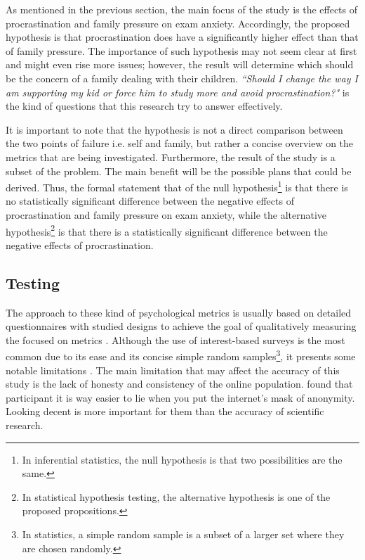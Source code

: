 \documentclass[12pt]{report}
\begin{document}
As mentioned in the previous section, the main focus of the study is the effects
of procrastination and family pressure on exam anxiety. Accordingly, the
proposed hypothesis is that procrastination does have a significantly higher
effect than that of family pressure. The importance of such hypothesis may not
seem clear at first and might even rise more issues; however, the result will
determine which should be the concern of a family dealing with their children.
\textit{``Should I change the way I am supporting my kid or force him to study
more and avoid procrastination?"} is the kind of questions that this research
try to answer effectively.

It is important to note that the hypothesis is not a direct comparison between
the two points of failure i.e. self and family, but rather a concise overview on
the metrics that are being investigated. Furthermore, the result of the study is
a subset of the problem. The main benefit will be the possible plans that could
be derived. Thus, the formal statement that of the null hypothesis\footnote{In
inferential statistics, the null hypothesis is that two possibilities are the
same.} is that there is no statistically significant difference between the
negative effects of procrastination and family pressure on exam anxiety, while
the alternative hypothesis\footnote{In statistical hypothesis testing, the
alternative hypothesis is one of the proposed propositions.} is that there is a
statistically significant difference between the negative effects of
procrastination.

\subsection{Testing}

The approach to these kind of psychological metrics is usually based on detailed
questionnaires with studied designs to achieve the goal of qualitatively
measuring the focused on metrics \parencite{jack1998purpose}. Although the use
of interest-based surveys is the most common due to its ease and its concise
simple random samples\footnote{In statistics, a simple random sample is a subset
of a larger set where they are chosen randomly.}, it presents some notable
limitations \parencite{wright2005researching}. The main limitation that may
affect the accuracy of this study is the lack of honesty and consistency of the
online population. \cite{lying} found that participant it is way easier to lie
when you put the internet's mask of anonymity. Looking decent is more important
for them than the accuracy of scientific research.
\end{document}
